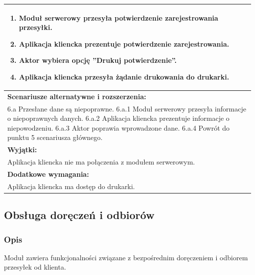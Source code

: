\begin{center}
\begin{longtable}[h]{|p{1.6cm}|p{13.5cm}|}
{\begin{enumerate}
\item Moduł serwerowy przesyła potwierdzenie zarejestrowania przesyłki.
\item Aplikacja kliencka prezentuje potwierdzenie zarejestrowania.
\item Aktor wybiera opcję ''Drukuj potwierdzenie''.
\item Aplikacja kliencka przesyła żądanie drukowania do drukarki.
\end{enumerate}
} \\ \hline
\multicolumn{2}{|p{15.1cm}|}{\textbf{Scenariusze alternatywne i rozszerzenia:}} \\
\multicolumn{2}{|p{15.1cm}|}{
6.a Przesłane dane są niepoprawne. \newline
6.a.1 Moduł serwerowy przesyła informacje o niepoprawnych danych. \newline
6.a.2 Aplikacja kliencka prezentuje informacje o niepowodzeniu. \newline
6.a.3 Aktor poprawia wprowadzone dane. \newline
6.a.4 Powrót do punktu 5 scenariusza głównego.
} \\ \hline
\multicolumn{2}{|p{15.1cm}|}{\textbf{Wyjątki:}} \\
\multicolumn{2}{|p{15.1cm}|}{
Aplikacja kliencka nie ma połączenia z modułem serwerowym.
} \\ \hline
\multicolumn{2}{|p{15.1cm}|}{\textbf{Dodatkowe wymagania:}} \\
\multicolumn{2}{|p{15.1cm}|}{
Aplikacja kliencka ma dostęp do drukarki.
} \\
\hline
\end{longtable}
\end{center}

\subsection{Obsługa doręczeń i odbiorów}
\subsubsection*{Opis}
Moduł zawiera funkcjonalności związane z bezpośrednim doręczeniem i odbiorem przesyłek od klienta.

